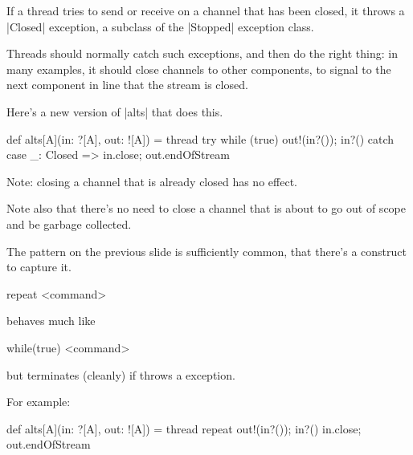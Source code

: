 \documentclass[notes,color]{sepslide0}
\begin{document}
\begin{slide}

If a thread tries to send or receive on a channel that has been closed, it
throws a |Closed| exception, a subclass of the |Stopped| exception class. 

Threads should normally catch such exceptions, and then do the right thing: in
many examples, it should close channels to other components, to signal to the
next component in line that the stream is closed.

Here's a new version of
|alts| that does this.
%
\begin{scala}
def alts[A](in: ?[A], out: ![A]) = thread{ 
  try{ while (true) { out!(in?()); in?() } } 
  catch{ case _: Closed => in.close; out.endOfStream }
}
\end{scala}

Note: closing a channel that is already closed has no effect.

Note also that there's no need to close a channel that is about to go out of
scope and be garbage collected. 
\end{slide}

\begin{slide}

The pattern on the previous slide is sufficiently common, that there's a
construct to capture it.  
%
\begin{scala}
  repeat{ <command> }
\end{scala}
%
behaves much like
\begin{scala}
  while(true){ <command> }
\end{scala}
but terminates (cleanly) if  throws a 
exception.

For example:
%
\begin{scala}
def alts[A](in: ?[A], out: ![A]) = thread{ 
  repeat{ out!(in?()); in?() } 
  in.close; out.endOfStream
}
\end{scala}
\end{slide}

\end{document}
